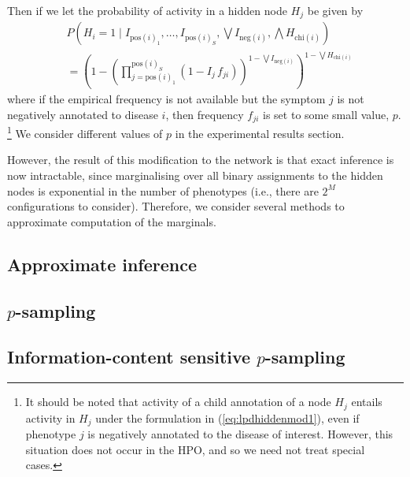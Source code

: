 Then if we let the probability of activity in a hidden node $H_j$ be given by
\begin{align}\label{eq:lpdhiddenmod1}
    &P\left(H_i = 1 \mid I_{\text{pos}(i)_1}, \hdots, I_{\text{pos}(i)_S},
    \bigvee I_{\text{neg}(i)}, \bigwedge H_{\text{chi}(i)}\right)\nonumber\\
        &= \left(
            1 - 
            \left(
                \prod_{j=\text{pos}(i)_1}^{\text{pos}(i)_S}
                \left(1 - I_j \, f_{ji}\right)
            \right) ^{1 - \bigvee I_{\text{neg}(i)}}
        \right)
        ^{1 - \bigvee H_{\text{chi}(i)}}
\end{align}
where if the empirical frequency is not available but the symptom $j$ is not
negatively annotated to disease $i$, then frequency $f_{ji}$ is set to some
small value, $p$.
%
\footnote{It should be noted that activity of a child annotation of a node
    $H_j$ entails activity in $H_j$ under the formulation in
    (\ref{eq:lpdhiddenmod1}), even if phenotype $j$ is negatively annotated
    to the disease of interest. However, this situation does not occur in the
    HPO, and so we need not treat special cases.
}
%
We consider different values of $p$ in the experimental results section.

However, the result of this modification to the network is that exact inference
is now intractable, since marginalising over all binary assignments to the
hidden nodes is exponential in the number of phenotypes (i.e., there are $2^M$
configurations to consider). Therefore, we consider several methods to
approximate computation of the marginals.

\subsection{Approximate inference}

\subsection{$p$-sampling}

\subsection{Information-content sensitive $p$-sampling}

